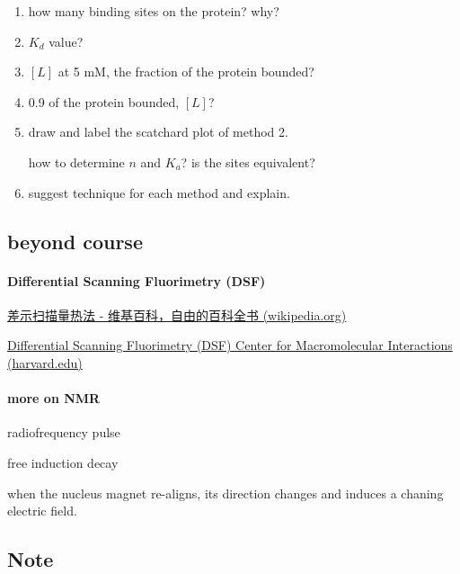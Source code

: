 \documentclass[]{article}
\let\oldparagraph\paragraph
\renewcommand{\paragraph}[1]{\oldparagraph{#1}\mbox{}}
\begin{document}
\begin{enumerate}
  \begin{enumerate}
  \def\labelenumii{\arabic{enumii}.}
  \item
    how many binding sites on the protein? why?
  \item
    \(K_d\) value?
  \item
    \([L]\) at 5 mM, the fraction of the protein bounded?
  \item
    0.9 of the protein bounded, \([L]\)?
  \item
    draw and label the scatchard plot of method 2.

    how to determine \(n\) and \(K_a\)? is the sites equivalent?
  \item
    suggest technique for each method and explain.
  \end{enumerate}
\end{enumerate}

\hypertarget{beyond-course}{%
\subsection{beyond course}\label{beyond-course}}

\hypertarget{differential-scanning-fluorimetry-dsf}{%
\paragraph{Differential Scanning Fluorimetry
(DSF)}\label{differential-scanning-fluorimetry-dsf}}

\href{https://zh.wikipedia.org/wiki/差示扫描量热法}{差示扫描量热法 -
维基百科，自由的百科全书 (wikipedia.org)}

\href{https://cmi.hms.harvard.edu/differential-scanning-fluorimetry}{Differential
Scanning Fluorimetry (DSF) \textbar{} Center for Macromolecular
Interactions (harvard.edu)}

\hypertarget{more-on-nmr}{%
\paragraph{more on NMR}\label{more-on-nmr}}

radiofrequency pulse

free induction decay

when the nucleus magnet re-aligns, its direction changes and induces a
chaning electric field.

\hypertarget{note}{%
\subsection{Note}\label{note}}
\end{document}
